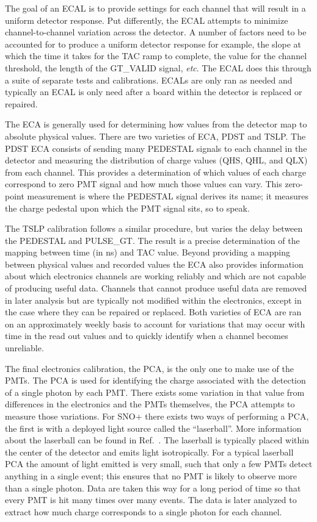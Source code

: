 The goal of an ECAL is to provide settings for each channel that will result in a uniform
detector response. Put differently, the ECAL attempts to minimize channel-to-channel variation
across the detector.
A number of factors need to be accounted for to produce a uniform detector response for example,
the slope at which the time it takes for the TAC ramp to complete, the value for the
channel threshold, the length of the GT\_VALID signal, \textit{etc}.
The ECAL does this through a suite of separate tests and calibrations.
ECALs are only ran as needed and typically an ECAL is only need after a board within the
detector is replaced or repaired.

The ECA is generally used for determining how values from the detector map to absolute
physical values.
There are two varieties of ECA,  PDST and  TSLP\@.
The PDST ECA consists of sending many PEDESTAL signals to each channel in the detector and
measuring the distribution of charge values (QHS, QHL, and QLX) from each channel.
This provides a determination of which values of each charge correspond to zero PMT
signal and how much those values can vary.
This zero-point measurement is where the PEDESTAL signal derives its name; it measures
the charge pedestal upon which the PMT signal sits, so to speak.

The TSLP calibration follows a similar procedure, but varies the delay between
the PEDESTAL and PULSE\_GT\@.
The result is a precise determination of the mapping between time (in ns) and
TAC value.
Beyond providing a mapping between physical values and recorded values the ECA
also provides information about which electronics channels are working reliably
and which are not capable of producing useful data.
Channels that cannot produce useful data are removed in later analysis but are
typically not modified within the electronics, except in the case where they
can be repaired or replaced.
Both varieties of ECA are ran on an approximately weekly basis to account for
variations that may occur with time in the read out values and to quickly
identify when a channel becomes unreliable.

The final electronics calibration, the PCA, is the only one to make use of the PMTs.
The PCA is used for identifying the charge associated with the detection of a single
photon by each PMT\@.
There exists some variation in that value from differences in the
electronics and the PMTs themselves, the PCA attempts to measure those variations.
For SNO+ there exists two ways of performing a PCA, the first is with a deployed light
source called the ``laserball''.
More information about the laserball can be found in Ref.~\citep{sno_laserball}.
The laserball is typically placed within the center of the
detector and emits light isotropically. For a typical laserball PCA the amount of light emitted
is very small, such that only a few PMTs detect anything in a single event;
this ensures that no PMT is likely to observe more than a single photon.
Data are taken this way for a long period of time so that every PMT is hit many times over
many events. The data is later analyzed to extract how much charge corresponds to a single
photon for each channel.

